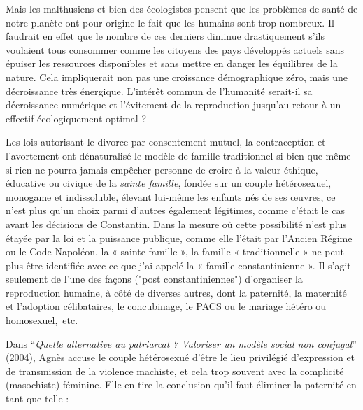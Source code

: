  Mais les malthusiens et bien des écologistes pensent que les problèmes de santé de notre planète ont pour origine le fait que les humains sont trop nombreux. Il faudrait en effet que le nombre de ces derniers diminue drastiquement s'ils voulaient tous consommer comme les citoyens des pays développés actuels sans épuiser les ressources disponibles et sans mettre en danger les équilibres de la nature. Cela impliquerait non pas une croissance démographique zéro, mais une décroissance très énergique. L'intérêt commun de l'humanité serait-il sa décroissance numérique et l'évitement de la reproduction jusqu'au retour à un effectif écologiquement optimal ? 
 




Les lois autorisant le divorce par consentement mutuel, la contraception et l'avortement ont dénaturalisé le modèle de famille traditionnel si bien que même si rien ne pourra jamais empêcher personne de croire à la valeur éthique, éducative ou civique de la {\emph{sainte famille}}, fondée sur un couple hétérosexuel, monogame et indissoluble, élevant lui-même les enfants nés de ses œuvres, ce n'est plus qu'un choix parmi d'autres également légitimes, comme c'était le cas avant les décisions de Constantin. Dans la mesure où cette possibilité n'est plus étayée par la loi et la puissance publique, comme elle l'était par l'Ancien Régime ou le Code Napoléon, la « sainte famille », la famille « traditionnelle » ne peut plus être identifiée avec ce que j'ai appelé la « famille constantinienne ». Il s'agit seulement de l'une des façons ("post constantiniennes") d'organiser la reproduction humaine, à côté de diverses autres, dont la paternité, la maternité et l'adoption célibataires, le concubinage, le PACS ou le mariage hétéro ou homosexuel,~etc.

Dans \enquote{\emph{Quelle alternative au patriarcat ? Valoriser un modèle social non conjugal}} (2004), Agnès  accuse le couple hétérosexué d'être le lieu privilégié d'expression et de transmission de la violence machiste, et cela trop souvent avec la complicité (masochiste) féminine. Elle en tire la conclusion qu'il faut éliminer la paternité en tant que telle :

